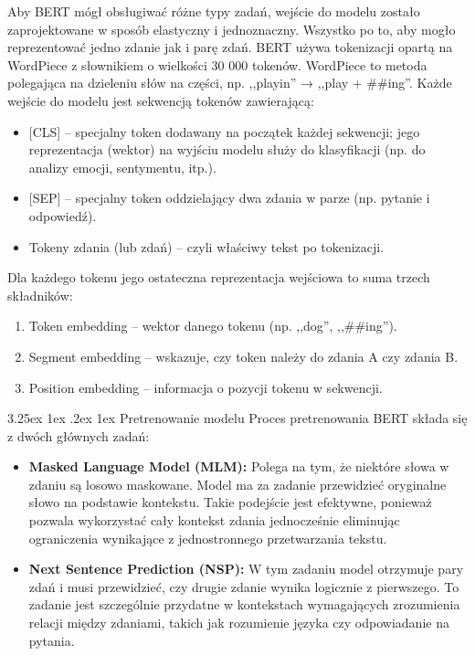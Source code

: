 \documentclass[wmii, inf, mgr]{uwmthesis}
\makeatletter
\renewcommand\paragraph{\@startsection{paragraph}{4}{\z@}%
  {3.25ex \@plus1ex \@minus.2ex}%
  {1ex}%
  {\normalfont\normalsize\bfseries}}
\makeatother
\begin{document}
Aby BERT mógł obsługiwać różne typy zadań, wejście do modelu zostało zaprojektowane w sposób elastyczny i jednoznaczny. Wszystko po to, aby mogło reprezentować jedno zdanie jak i parę zdań. BERT używa tokenizacji opartą na WordPiece z słownikiem o wielkości 30 000 tokenów. WordPiece to metoda polegająca na dzieleniu słów na części, np. ,,playin'' → ,,play + \#\#ing''. Każde wejście do modelu jest sekwencją tokenów zawierającą:

\begin{itemize}
   \item {[CLS]} -- specjalny token dodawany na początek każdej sekwencji; jego reprezentacja (wektor) na wyjściu modelu służy do klasyfikacji (np. do analizy emocji, sentymentu, itp.).
   \item {[SEP]} -- specjalny token oddzielający dwa zdania w parze (np. pytanie i odpowiedź).
   \item {Tokeny zdania (lub zdań)} -- czyli właściwy tekst po tokenizacji.
\end{itemize}


Dla każdego tokenu jego ostateczna reprezentacja wejściowa to suma trzech składników:

\begin{enumerate}
    \item Token embedding -- wektor danego tokenu (np. ,,dog'', ,,\#\#ing'').
    \item Segment embedding -- wskazuje, czy token należy do zdania A czy zdania B.
    \item Position embedding -- informacja o pozycji tokenu w sekwencji.
\end{enumerate}


\paragraph{Pretrenowanie modelu}
Proces pretrenowania BERT składa się z dwóch głównych zadań:

\begin{itemize}
	\item \textbf{Masked Language Model (MLM):} Polega na tym, że niektóre słowa w zdaniu są losowo maskowane. Model ma za zadanie przewidzieć oryginalne słowo na podstawie kontekstu. Takie podejście jest efektywne, ponieważ pozwala wykorzystać cały kontekst zdania jednocześnie eliminując ograniczenia wynikające z jednostronnego przetwarzania tekstu.
	
	\item \textbf{Next Sentence Prediction (NSP):} W tym zadaniu model otrzymuje pary zdań i musi przewidzieć, czy drugie zdanie wynika logicznie z pierwszego. To zadanie jest szczególnie przydatne w kontekstach wymagających zrozumienia relacji między zdaniami, takich jak rozumienie języka czy odpowiadanie na pytania.
\end{itemize}
\end{document}
